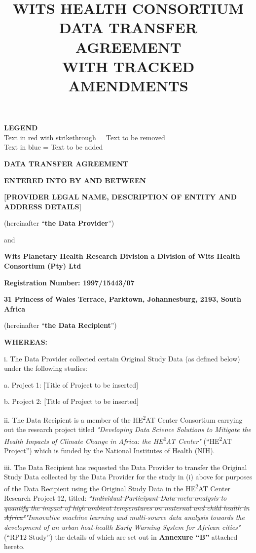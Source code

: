 \documentclass[12pt,letterpaper]{article}
\title{\textbf{WITS HEALTH CONSORTIUM\\DATA TRANSFER AGREEMENT\\WITH TRACKED AMENDMENTS}}
\author{}
\date{}
\newcommand{\deleted}[1]{\textcolor{deletecolor}{\sout{#1}}}
\newcommand{\added}[1]{\textcolor{addcolor}{#1}}
\begin{document}
\maketitle

\begin{center}
\textbf{LEGEND}\\
\textcolor{deletecolor}{Text in red with strikethrough} = Text to be removed\\
\textcolor{addcolor}{Text in blue} = Text to be added
\end{center}

\vspace{1cm}

\textbf{DATA TRANSFER AGREEMENT}

\textbf{ENTERED INTO BY AND BETWEEN}

\textbf{[PROVIDER LEGAL NAME, DESCRIPTION OF ENTITY AND ADDRESS DETAILS]}

(hereinafter ``\textbf{the Data Provider}'')

and

\textbf{Wits Planetary Health Research Division a Division of Wits Health Consortium (Pty) Ltd}

\textbf{Registration Number: 1997/15443/07}

\textbf{31 Princess of Wales Terrace, Parktown, Johannesburg, 2193, South Africa}

(hereinafter ``\textbf{the Data Recipient}'')

\textbf{WHEREAS:}

i. The Data Provider collected certain Original Study Data (as defined below) under the following studies:

a. Project 1: [Title of Project to be inserted]

b. Project 2: [Title of Project to be inserted]

ii. The Data Recipient is a member of the HE\textsuperscript{2}AT Center Consortium carrying out the research project titled \textit{"Developing Data Science Solutions to Mitigate the Health Impacts of Climate Change in Africa: the HE\textsuperscript{2}AT Center"} (``HE\textsuperscript{2}AT Project'') which is funded by the National Institutes of Health (NIH).

iii. The Data Recipient has requested the Data Provider to transfer the Original Study Data collected by the Data Provider for the study in (i) above for purposes of the Data Recipient using the Original Study Data in the HE\textsuperscript{2}AT Center Research Project \deleted{1}\added{2}, titled: \deleted{\textit{"Individual Participant Data meta-analysis to quantify the impact of high ambient temperatures on maternal and child health in Africa"}}\added{\textit{"Innovative machine learning and multi-source data analysis towards the development of an urban heat-health Early Warning System for African cities"}} (``RP\deleted{1}\added{2} Study'') the details of which are set out in \textbf{Annexure ``B''} attached hereto.
\end{document}
